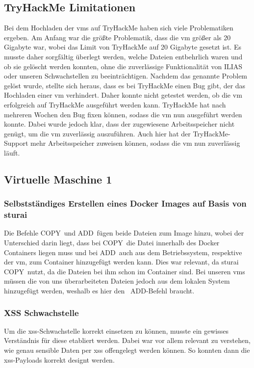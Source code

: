 \documentclass[10pt, a4paper,onecolumn ,titlepage]{article}
\begin{document}
    \subsection{TryHackMe Limitationen}
    \label{subsec:lessonslearnedTHM}
    Bei dem Hochladen der \ac{vm}s auf TryHackMe haben sich viele Problematiken ergeben.
    Am Anfang war die größte Problematik, dass die \ac{vm} größer als 20 Gigabyte war, wobei das Limit von TryHackMe auf 20 Gigabyte gesetzt ist.
    Es musste daher sorgfältig überlegt werden, welche Dateien entbehrlich waren und ob sie gelöscht werden konnten, ohne die zuverlässige Funktionalität von ILIAS oder unseren Schwachstellen zu beeinträchtigen.
    Nachdem das genannte Problem gelöst wurde, stellte sich heraus, dass es bei TryHackMe einen Bug gibt, der das Hochladen einer \ac{vm} verhindert.
    Daher konnte nicht getestet werden, ob die \ac{vm} erfolgreich auf TryHackMe ausgeführt werden kann.
    TryHackMe hat nach mehreren Wochen den Bug fixen können, sodass die \ac{vm} nun ausgeführt werden konnte.
    Dabei wurde jedoch klar, dass der zugewiesene Arbeitsspeicher nicht genügt, um die \ac{vm} zuverlässig auszuführen.
    Auch hier hat der TryHackMe-Support mehr Arbeitsspeicher zuweisen können, sodass die \ac{vm} nun zuverlässig läuft.

    \subsection{Virtuelle Maschine 1}
    \label{subsec:vm1lessonslearned}

    \subsubsection{Selbstständiges Erstellen eines Docker Images auf Basis von sturai}
    \label{subsubsec:lessonslearnedDocker}
    Die Befehle \glqq COPY\grqq\ und \glqq ADD\grqq\ fügen beide Dateien zum Image hinzu, wobei der Unterschied darin liegt, dass bei \glqq COPY\grqq\ die Datei innerhalb des Docker Containers liegen muss und bei \glqq ADD\grqq\ auch aus dem Betriebssystem, respektive der \ac{vm}, zum Container hinzugefügt werden kann.
    Dies war relevant, da sturai \glqq COPY\grqq\ nutzt, da die Dateien bei ihm schon im Container sind. Bei unseren \ac{vm}s müssen die von uns überarbeiteten Dateien jedoch aus dem lokalen System hinzugefügt werden, weshalb es hier den \glqq\ ADD\grqq-Befehl braucht.

    \subsubsection{XSS Schwachstelle}
    \label{subsubsec:lessonslearnedXSS}
    Um die \ac{xss}-Schwachstelle korrekt einsetzen zu können, musste ein gewisses Verständnis für diese etabliert werden.
    Dabei war vor allem relevant zu verstehen, wie genau sensible Daten per \ac{xss} offengelegt werden können.
    So konnten dann die \ac{xss}-Payloads korrekt designt werden.
\end{document}
